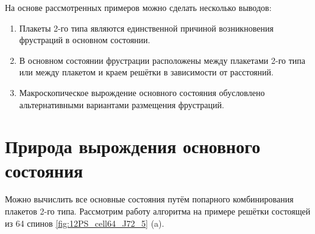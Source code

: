 \documentclass[utf8, babel, sor, jor, amsmath, amssymb, reprint]{elsarticle} %
\begin{document}
На основе рассмотренных примеров можно сделать несколько выводов:

\begin{enumerate}
	\item Плакеты 2-го типа являются единственной причиной возникновения фрустраций в основном состоянии.
	\item В основном состоянии фрустрации расположены между плакетами 2-го типа или между плакетом и краем решётки в зависимости от расстояний.
	\item Макроскопическое вырождение основного состояния обусловлено альтернативными вариантами размещения фрустраций.
\end{enumerate}

\section{Природа вырождения основного состояния}

Можно вычислить все основные состояния путём попарного комбинирования плакетов 2-го типа. Рассмотрим работу алгоритма на примере решётки состоящей из 64 спинов \ref{fig:12PS_cell64_J72_5} (a).
\end{document}
